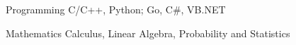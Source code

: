 


\begin{cvskills}


\cvskill
{Programming} %
{C/C++, Python; Go, C\#, VB.NET} %


\cvskill
{Mathematics} %
{Calculus, Linear Algebra, Probability and Statistics} %


\end{cvskills}